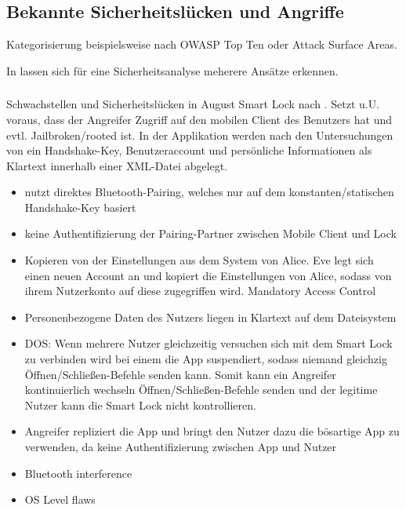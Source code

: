 \subsection{Bekannte Sicherheitslücken und Angriffe}
\label{sec:analysis_weaknesses}

    Kategorisierung beispielsweise nach OWASP Top Ten oder Attack Surface Areas.

    In  lassen sich für eine Sicherheitsanalyse meherere Ansätze erkennen. 
    
    \subsubsection{}
    Schwachstellen und Sicherheitslücken in August Smart Lock nach \citeauthor{Ye2017}.
	Setzt u.U. voraus, dass der Angreifer Zugriff auf den mobilen Client des Benutzers hat und evtl. Jailbroken/rooted ist.
	In der Applikation werden nach den Untersuchungen von \citeauthor{Ye2017} ein Handshake-Key, Benutzeraccount und persönliche Informationen als Klartext innerhalb einer XML-Datei abgelegt.
	\begin{itemize}
		\item nutzt direktes Bluetooth-Pairing, welches nur auf dem konstanten/statischen Handshake-Key basiert
		\item keine Authentifizierung der Pairing-Partner zwischen Mobile Client und Lock
		\item Kopieren von der Einstellungen aus dem System von Alice.
		    Eve legt sich einen neuen Account an und kopiert die Einstellungen von Alice, sodass von ihrem Nutzerkonto auf diese zugegriffen wird. \textrightarrow Mandatory Access Control
		\item Personenbezogene Daten des Nutzers liegen in Klartext auf dem Dateisystem
		\item DOS: Wenn mehrere Nutzer gleichzeitig versuchen sich mit dem Smart Lock zu verbinden wird bei einem die App suspendiert, sodass niemand gleichzig Öffnen/Schließen-Befehle senden kann.
		    Somit kann ein Angreifer kontinuierlich wechseln Öffnen/Schließen-Befehle senden und der legitime Nutzer kann die Smart Lock nicht kontrollieren.
	   \item Angreifer repliziert die App und bringt den Nutzer dazu die bösartige App zu verwenden, da keine Authentifizierung zwischen App und Nutzer
	   \item Bluetooth interference
	   \item OS Level flaws
	\end{itemize}

